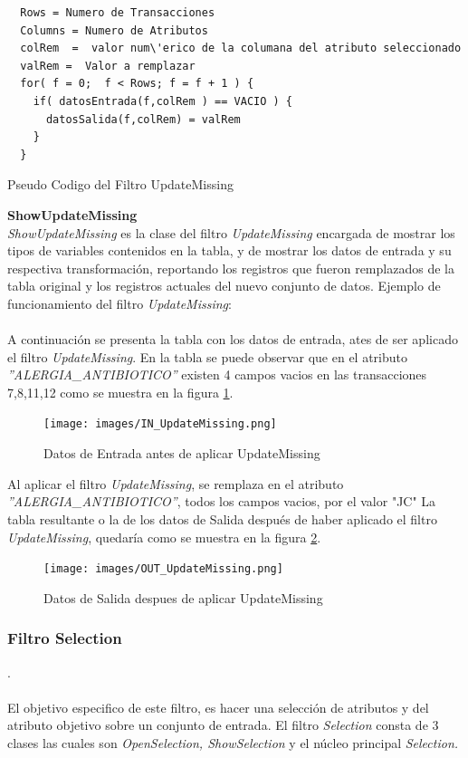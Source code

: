 \begin{codigof}
\begin{verbatim}      
  Rows = Numero de Transacciones
  Columns = Numero de Atributos
  colRem  =  valor num\'erico de la columana del atributo seleccionado
  valRem =  Valor a remplazar
  for( f = 0;  f < Rows; f = f + 1 ) {
    if( datosEntrada(f,colRem ) == VACIO ) { 
      datosSalida(f,colRem) = valRem
    }
  }
\end{verbatim}
\caption{Pseudo Codigo del Filtro UpdateMissing}
\label{PseudoUpdateMissing}
\end{codigof}   
      
\textbf{ShowUpdateMissing} \\
\textit{ShowUpdateMissing} es la clase del filtro \textit{UpdateMissing} encargada de mostrar los tipos de variables contenidos en la tabla, y de mostrar los datos de entrada y su respectiva transformaci\'on, reportando los registros que fueron remplazados de la tabla original y los registros actuales del nuevo conjunto de datos.
Ejemplo de funcionamiento del filtro \textit{UpdateMissing}:\\ \\
A continuaci\'on se presenta la tabla con los datos de entrada, ates de ser aplicado el filtro \textit{UpdateMissing}.  En la tabla se puede observar que en el atributo \textit{''ALERGIA\_ANTIBIOTICO''} existen 4 campos vacios en las transacciones 7,8,11,12 como se muestra en la figura \ref{IN_UpdateMissing}.\\ 

\begin{figure}[h]
\centering
\texttt{[image: images/IN\_UpdateMissing.png]}
\caption{Datos de Entrada antes de aplicar UpdateMissing}
\label{IN_UpdateMissing}
\end{figure}

Al aplicar el filtro \textit{UpdateMissing}, se remplaza en el atributo \textit{''ALERGIA\_ANTIBIOTICO''}, todos los campos vacios, por el valor "JC"
La tabla resultante o la de los datos de Salida despu\'es de haber aplicado el filtro \textit{UpdateMissing}, quedar\'ia como se muestra en la figura \ref{OUT_UpdateMissing}. \\

\begin{figure}[h]
\centering
\texttt{[image: images/OUT\_UpdateMissing.png]}
\caption{Datos de Salida despues de aplicar UpdateMissing}
\label{OUT_UpdateMissing}
\end{figure}

\subsubsection{Filtro Selection}. \\ \\
El objetivo especifico de este filtro, es hacer una selecci\'on de atributos y del atributo objetivo sobre un conjunto de entrada.
El filtro  \textit{Selection} consta de 3 clases las cuales son \textit{OpenSelection, ShowSelection} y el n\'ucleo principal  \textit{Selection.} \\ \\

